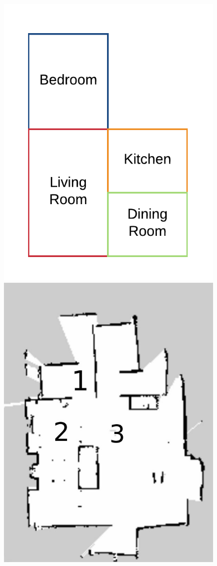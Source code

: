 \begin{figure}[H]
    \centering
        \includegraphics[scale=1]{images/testbed_map}
        \includegraphics[scale=0.25]{images/home_map}

\end{figure}
